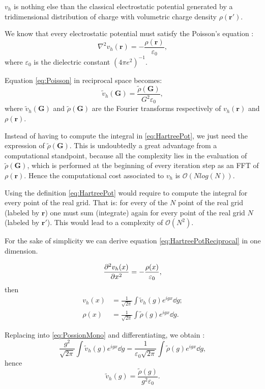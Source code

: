 \documentclass[a4paper,12pt]{article}
\newcommand\mf[1]{\mathbf{#1}}
\newcommand\dens{\rho(\mathbf{r})}
\newcommand\erre{\mathbf{r}}
\newcommand\bigO{\mathcal{O}}
\begin{document}
$v_{h}$ is nothing else than the classical electrostatic potential generated by a tridimensional distribution of charge with volumetric charge density $\rho(\erre')$.

We know that every electrostatic potential must satisfy the Poisson's equation :
\begin{equation}\label{eq:Poisson}
	\nabla^2 v_{h}(\erre) = - \frac{\dens}{\varepsilon_{0}},
\end{equation} 
where $\varepsilon_{0}$ is the dielectric constant $(4\pi e^2)^{-1}$.

Equation \eqref{eq:Poisson} in reciprocal space becomes:
\begin{equation}\label{eq:HartreePotReciprocal}
	\tilde{v}_{h}(\mf{G}) = \frac{\tilde{\rho}(\mf{G})}{G^2 \varepsilon_{0}},
\end{equation}
where $\tilde{v}_{h}(\mf{G})$ and $\tilde{\rho}(\mf{G})$ are the Fourier transforms respectively of $v_{h}(\erre)$ and $\dens$.

Instead of having to compute the integral in \eqref{eq:HartreePot}, we just need the expression of $\tilde{\rho}(\mf{G})$.
This is undoubtedly a great advantage from a computational standpoint, because all the complexity lies in the evaluation of $\tilde{\rho}(\mf{G})$, which is performed at the beginning of every iteration step as an FFT of $\dens$.
Hence the computational cost associated to $v_{h}$ is $\bigO(N log(N))$.

Using the definition \eqref{eq:HartreePot} would require to compute the integral for every point of the real grid. 
That is: for every of the $N$ point of the real grid (labeled by $\mf{r}$) one must sum (integrate) again for every point of the real grid $N$ (labeled by $\mf{r}'$). 
This would lead to a complexity of $\mathcal{O}(N^2)$.

For the sake of simplicity we can derive equation \eqref{eq:HartreePotReciprocal} in one dimension.

\begin{equation} \label{eq:PossionMono}
	\pdv[2]{v_{h}(x)}{x} = - \frac{\rho(x)}{\varepsilon_0},
\end{equation}
then 
\begin{align*}
	v_{h}(x) &= \frac{1}{\sqrt{2\pi}} \int \tilde{v}_{h}(g) e^{i g x} \dd{g}; \\
	\rho(x) &= \frac{1}{\sqrt{2\pi}} \int \tilde{\rho}(g) e^{i g x} \dd{g}.
\end{align*}

Replacing into  \eqref{eq:PossionMono} and differentiating, we obtain :
\begin{equation}
	\frac{g^2}{\sqrt{2\pi}} \int \tilde{v}_{h}(g) e^{i g x} \dd{g} = \frac{1}{\varepsilon_{0}\sqrt{2\pi}} \int \tilde{\rho}(g) e^{i g x} \dd{g},
\end{equation}
hence 
\begin{equation}
	\tilde{v}_{h}(g) = \frac{\tilde{\rho}(g)}{g^2 \varepsilon_{0}}.
\end{equation}
\end{document}
